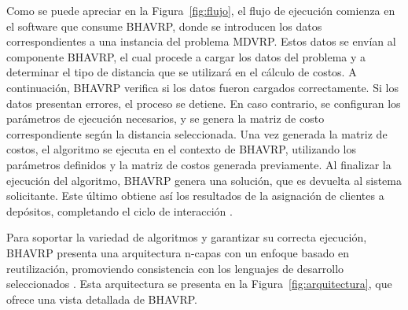 Como se puede apreciar en la Figura~\ref{fig:flujo}, el flujo de ejecución comienza en el software que consume BHAVRP, donde se introducen los datos correspondientes a una instancia del problema MDVRP. Estos datos se envían al componente BHAVRP, el cual procede a cargar los datos del problema y a determinar el tipo de distancia que se utilizará en el cálculo de costos. A continuación, BHAVRP verifica si los datos fueron cargados correctamente. Si los datos presentan errores, el proceso se detiene. En caso contrario, se configuran los parámetros de ejecución necesarios, y se genera la matriz de costo correspondiente según la distancia seleccionada. Una vez generada la matriz de costos, el algoritmo se ejecuta en el contexto de BHAVRP, utilizando los parámetros definidos y la matriz de costos generada previamente. Al finalizar la ejecución del algoritmo, BHAVRP genera una solución, que es devuelta al sistema solicitante. Este último obtiene así los resultados de la asignación de clientes a depósitos, completando el ciclo de interacción  \parencite{ericramosaragonIncorporacionModuloMetricas2025}.


Para soportar la variedad de algoritmos y garantizar su correcta ejecución, BHAVRP presenta una arquitectura n-capas con un enfoque basado en reutilización, promoviendo consistencia con los lenguajes de desarrollo seleccionados  \parencite{ericramosaragonIncorporacionModuloMetricas2025}. Esta arquitectura se presenta en la Figura~\ref{fig:arquitectura}, que ofrece una vista detallada de BHAVRP.


